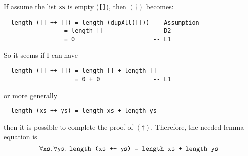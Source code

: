 If assume the list \texttt{xs} is empty (\texttt{[]}), then \((\dagger)\) becomes:
\begin{lstlisting}
  length ([] ++ []) = length (dupAll([])) -- Assumption
                 = length []              -- D2
                 = 0                      -- L1
\end{lstlisting}
So it seems if I can have
\begin{lstlisting}
  length ([] ++ []) = length [] + length []
                    = 0 + 0               -- L1
\end{lstlisting}
or more generally
\begin{lstlisting}
  length (xs ++ ys) = length xs + length ys
\end{lstlisting}
then it is possible to complete the proof of \((\dagger)\).  Therefore, the needed lemma equation is
\[
  \forall\verb|xs|.\,\forall\verb|ys|.\:\:
 \verb|length (xs ++ ys) = length xs + length ys|
\]
